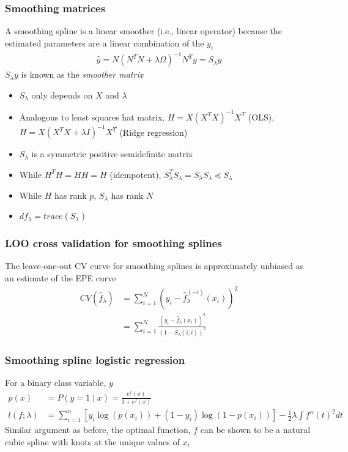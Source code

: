 \documentclass{article}
\begin{document}
\subsubsection{Smoothing matrices}
A smoothing spline is a linear smoother (i.e., linear operator) because the estimated parameters are a linear combination of the $y_i$
\begin{align*}
  \hat{y} = N(N^TN + \lambda \Omega)^{-1}N^Ty = S_\lambda y
\end{align*}
$S_\lambda y$ is known as the \textit{smoother matrix}
\begin{itemize}
  \item $S_\lambda$ only depends on $X$ and $\lambda$
  \item Analogous to least squares hat matrix, $H = X(X^TX)^{-1}X^T$ (OLS), $H = X(X^TX + \lambda I)^{-1}X^T$ (Ridge regression)
  \item $S_\lambda$ is a symmetric positive semidefinite matrix
  \item While $H^TH = HH = H$ (idempotent), $S_\lambda^TS_\lambda = S_\lambda S_\lambda \preceq S_\lambda$
  \item While $H$ has rank $p$, $S_\lambda$ has rank $N$
  \item $df_\lambda = trace(S_\lambda)$
\end{itemize}

\subsubsection{LOO cross validation for smoothing splines}
The leave-one-out CV curve for smoothing splines is approximately unbiased as an estimate of the EPE curve
\begin{align*}
  CV(\hat{f}_\lambda) &= \sum_{i=1}^N(y_i - \hat{f}^{(-i)}_\lambda(x_i))^2\\
  &= \sum_{i=1}^N\frac{(y_i - \hat{f}_\lambda(x_i))^2}{(1 - S_\lambda(i, i))^2}
\end{align*}

\subsubsection{Smoothing spline logistic regression}
For a binary class variable, $y$
\begin{align*}
  p(x) &= P(y=1 \mid x) = \frac{e^f(x)}{1 + e^f(x)}\\
  l(f;\lambda) &= \sum_{i=1}^n[y_i \log(p(x_i)) + (1-y_i)\log(1-p(x_i))] - \frac{1}{2}\lambda \int f''(t)^2dt
\end{align*}
Similar argument as before, the optimal function, $f$ can be shown to be a natural cubic spline with knots at the unique values of $x_i$
\end{document}
